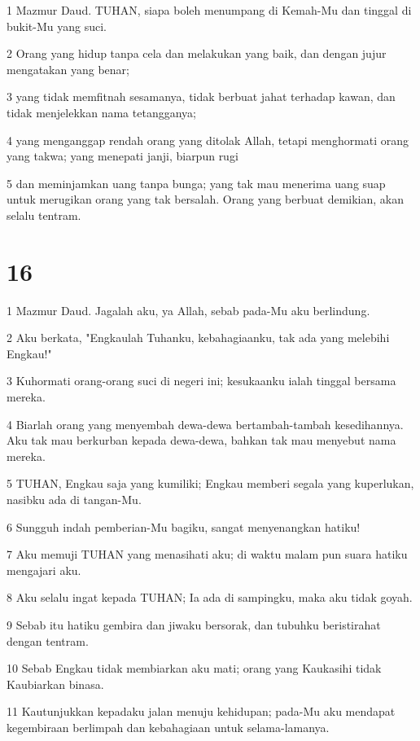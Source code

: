 \par 1 Mazmur Daud. TUHAN, siapa boleh menumpang di Kemah-Mu dan tinggal di bukit-Mu yang suci.
\par 2 Orang yang hidup tanpa cela dan melakukan yang baik, dan dengan jujur mengatakan yang benar;
\par 3 yang tidak memfitnah sesamanya, tidak berbuat jahat terhadap kawan, dan tidak menjelekkan nama tetangganya;
\par 4 yang menganggap rendah orang yang ditolak Allah, tetapi menghormati orang yang takwa; yang menepati janji, biarpun rugi
\par 5 dan meminjamkan uang tanpa bunga; yang tak mau menerima uang suap untuk merugikan orang yang tak bersalah. Orang yang berbuat demikian, akan selalu tentram.

\chapter{16}

\par 1 Mazmur Daud. Jagalah aku, ya Allah, sebab pada-Mu aku berlindung.
\par 2 Aku berkata, "Engkaulah Tuhanku, kebahagiaanku, tak ada yang melebihi Engkau!"
\par 3 Kuhormati orang-orang suci di negeri ini; kesukaanku ialah tinggal bersama mereka.
\par 4 Biarlah orang yang menyembah dewa-dewa bertambah-tambah kesedihannya. Aku tak mau berkurban kepada dewa-dewa, bahkan tak mau menyebut nama mereka.
\par 5 TUHAN, Engkau saja yang kumiliki; Engkau memberi segala yang kuperlukan, nasibku ada di tangan-Mu.
\par 6 Sungguh indah pemberian-Mu bagiku, sangat menyenangkan hatiku!
\par 7 Aku memuji TUHAN yang menasihati aku; di waktu malam pun suara hatiku mengajari aku.
\par 8 Aku selalu ingat kepada TUHAN; Ia ada di sampingku, maka aku tidak goyah.
\par 9 Sebab itu hatiku gembira dan jiwaku bersorak, dan tubuhku beristirahat dengan tentram.
\par 10 Sebab Engkau tidak membiarkan aku mati; orang yang Kaukasihi tidak Kaubiarkan binasa.
\par 11 Kautunjukkan kepadaku jalan menuju kehidupan; pada-Mu aku mendapat kegembiraan berlimpah dan kebahagiaan untuk selama-lamanya.

